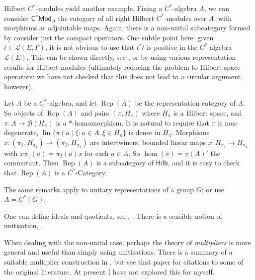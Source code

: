 \documentclass[a4paper,11pt]{article}
\theoremstyle{plain}
\theoremstyle{remark}
\newenvironment{remark}
  {\pushQED{\qed}\renewcommand{\qedsymbol}{$\triangle$}\remarkx}
  {\popQED\endremarkx}
\newenvironment{example}
  {\pushQED{\qed}\renewcommand{\qedsymbol}{$\triangle$}\examplex}
  {\popQED\endexamplex}
\newcommand{\mc}[1]{\mathcal{#1}}
\newcommand{\lin}{\operatorname{lin}}
\newcommand{\catHilb}{\textsf{Hilb}}
\newcommand{\catHCStar}[1]{\textsf{C$^*$Mod}_{#1}}
\newcommand{\Rep}{\operatorname{Rep}}
\begin{document}
\begin{example}\label{eg:HilbMods}
Hilbert $C^*$-modules yield another example.  Fixing a $C^*$-algebra $A$, we can consider $\catHCStar{A}$ the category of all right Hilbert $C^*$-modules over $A$, with morphisms as adjointable maps.  Again, there is a non-unital subcategory formed by consider just the compact operators.  One subtle point here: given $t \in \mc L(E,F)$, it is not obvious to use that $t^*t$ is positive in the $C^*$-algebra $\mc L(E)$.  This can be shown directly, see \cite[Lemma~4.1]{Lance_HilbModsBook}, or by using various representation results for Hilbert modules (ultimately reducing the problem to Hilbert space operators: we have not checked that this does not lead to a circular argument, however).
\end{example}

\begin{example}\label{eg:RepA}
Let $A$ be a $C^*$-algebra, and let $\Rep(A)$ be the representation category of $A$.  So objects of $\Rep(A)$ and pairs $(\pi,H_\pi)$ where $H_\pi$ is a Hilbert space, and $\pi\colon A\to\mc B(H_\pi)$ is a $*$-homomorphism.  It is natural to require that $\pi$ is non-degenerate, $\lin\{ \pi(a)\xi : a\in A, \xi\in H_\pi \}$ is dense in $H_\pi$.  Morphisms $x \colon (\pi_1,H_{\pi_1}) \to (\pi_2,H_{\pi_2})$ are intertwiners, bounded linear maps $x\colon H_{\pi_1}\to H_{\pi_2}$ with $x \pi_1(a) = \pi_2(a) x$ for each $a\in A$.  So $\hom(\pi) = \pi(A)'$ the commutant.  Then $\Rep(A)$ is a subcategory of $\catHilb$, and it is easy to check that $\Rep(A)$ is a $C^*$-Category.

The same remarks apply to unitary representations of a group $G$; or use $A = C^*(G)$.
\end{example}

One can define ideals and quotients, see \cite[Definition~1.6]{GLR_Wstar_categories}, \cite[Section~4]{mitchener_cstar_cats}.  There is a sensible notion of unitisation, \cite[Section~3]{mitchener_cstar_cats}.

\begin{remark}\label{rem:mults}
When dealing with the non-unital case, perhaps the theory of \emph{multipliers} is more general and useful than simply using unitisations.  There is a summary of a suitable multiplier construction in \cite[Section~2]{AV_Bicolimits_Cstar_Cats}, but see that paper for citations to some of the original literature.  At present I have not explored this for myself.
\end{remark}
\end{document}
